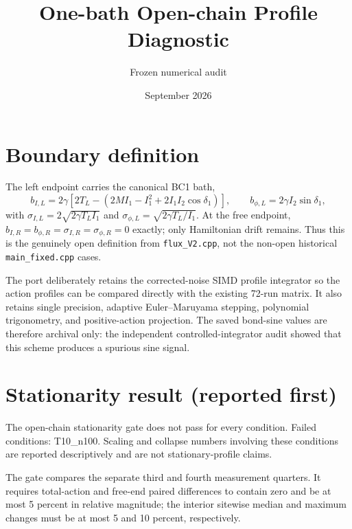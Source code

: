 \documentclass[10pt]{article}
\title{One-bath Open-chain Profile Diagnostic}
\author{Frozen numerical audit}
\date{September 2026}
\begin{document}
\sloppy
\maketitle

\section{Boundary definition}
The left endpoint carries the canonical BC1 bath,
\[
b_{I,L}=2\gamma\left[2T_L-(2MI_1-I_1^2+2I_1I_2\cos\delta_1)\right],\qquad
b_{\phi,L}=2\gamma I_2\sin\delta_1,
\]
with $\sigma_{I,L}=2\sqrt{2\gamma T_LI_1}$ and
$\sigma_{\phi,L}=\sqrt{2\gamma T_L/I_1}$.  At the free endpoint,
$b_{I,R}=b_{\phi,R}=\sigma_{I,R}=\sigma_{\phi,R}=0$ exactly; only
Hamiltonian drift remains.  Thus this is the genuinely open definition from
\texttt{flux\_V2.cpp}, not the non-open historical \texttt{main\_fixed.cpp}
cases.

The port deliberately retains the corrected-noise SIMD profile integrator so
the action profiles can be compared directly with the existing 72-run matrix.
It also retains single precision, adaptive Euler--Maruyama stepping,
polynomial trigonometry, and positive-action projection.  The saved bond-sine
values are therefore archival only: the independent controlled-integrator
audit showed that this scheme produces a spurious sine signal.

\section{Stationarity result (reported first)}
The open-chain stationarity gate does not pass for every condition. Failed conditions: T10\_n100. Scaling and collapse numbers involving these conditions are reported descriptively and are not stationary-profile claims.

The gate compares the separate third and fourth measurement quarters.  It
requires total-action and free-end paired differences to contain zero and be
at most 5 percent in relative magnitude; the interior sitewise median and
maximum changes must be at most 5 and 10 percent, respectively.
\end{document}
